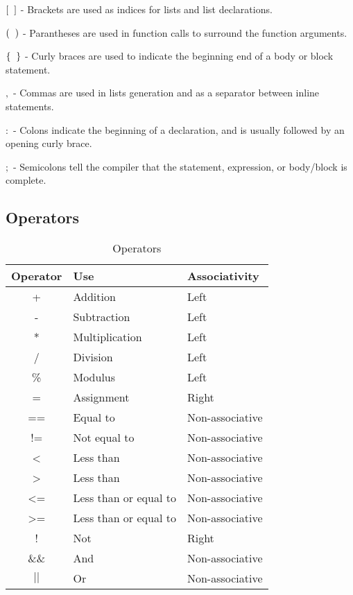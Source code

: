 \documentclass[a4paper]{article}
\begin{document}
\begin{description}
	\item{$[\hspace{2mm}]$} - Brackets are used as indices for lists and list declarations.
	\item{$(\hspace{2mm})$} - Parantheses are used in function calls to surround the function arguments.
    \item{$\{\hspace{2mm}\}$} - Curly braces are used to indicate the beginning end of a body or block statement.
    \item{$,$} - Commas are used in lists generation and as a separator between inline statements.
    \item{$:$} - Colons indicate the beginning of a declaration, and is usually followed by an opening curly brace.
    \item{$;$} - Semicolons tell the compiler that the statement, expression, or body/block is complete.
\end{description}

\subsection{Operators}

\begin{table}[H]
\centering
\begin{tabular}{|c|l|l|}
\hline
Operator & Use & Associativity\\
\hline
+ & Addition & Left\\
\hline
- & Subtraction & Left \\
\hline
* & Multiplication & Left\\
\hline
/ & Division & Left \\
\hline
\% & Modulus & Left \\
\hline
= & Assignment & Right \\
\hline 
== & Equal to & Non-associative\\
\hline
!= & Not equal to & Non-associative\\
\hline 
\textless & Less than & Non-associative\\
\hline 
\textgreater & Less than & Non-associative\\
\hline 
\textless= & Less than or equal to & Non-associative\\
\hline 
\textgreater= & Less than or equal to & Non-associative\\
\hline 
! & Not & Right\\
\hline
\&\& & And & Non-associative\\
\hline
$||$ & Or & Non-associative\\
\hline
\end{tabular}
\caption{Operators}
\end{table}
\end{document}
